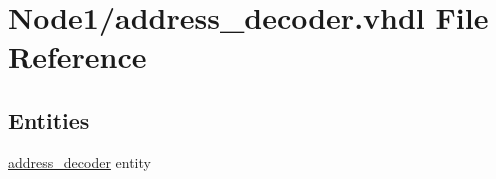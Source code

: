 \hypertarget{address__decoder_8vhdl}{}\section{Node1/address\+\_\+decoder.vhdl File Reference}
\label{address__decoder_8vhdl}
\subsection*{Entities}
\begin{DoxyCompactItemize}
\item 
\hyperlink{classaddress__decoder}{address\+\_\+decoder} entity
\end{DoxyCompactItemize}
